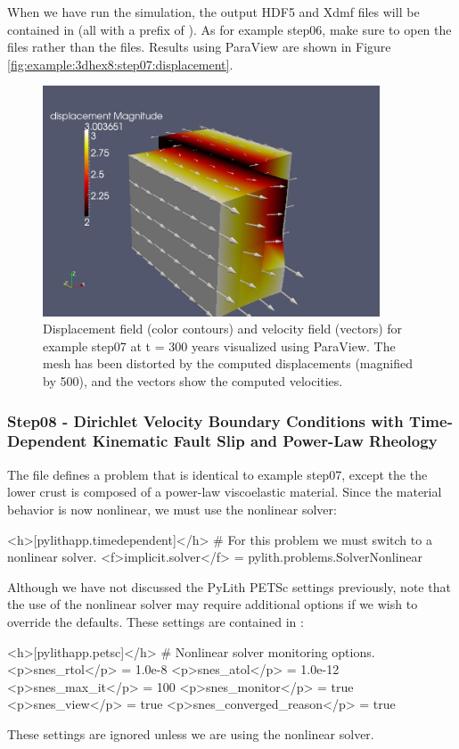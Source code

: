 When we have run the simulation, the output HDF5 and Xdmf files will
be contained in  (all with a prefix
of ). As for example step06, make sure to open the
 files rather than the  files. Results using
ParaView are shown in Figure \vref{fig:example:3dhex8:step07:displacement}.

\begin{figure}
  \includegraphics[width=10cm]{examples/figs/3dhex8_step07-displ-vel-t300}
  \caption{Displacement field (color contours) and velocity field (vectors) for
    example step07 at t = 300 years visualized using ParaView. The mesh
    has been distorted by the computed displacements (magnified by 500),
    and the vectors show the computed velocities.}
  \label{fig:example:3dhex8:step07:displacement}
\end{figure}


\subsubsection{Step08 - Dirichlet Velocity Boundary Conditions with Time-Dependent Kinematic Fault Slip and Power-Law Rheology}
\label{sec:example:3dhex8:step08}

The  file defines a problem that is identical to
example step07, except the the lower crust is composed of a power-law
viscoelastic material. Since the material behavior is now nonlinear,
we must use the nonlinear solver:
\begin{cfg}
<h>[pylithapp.timedependent]</h>
# For this problem we must switch to a nonlinear solver.
<f>implicit.solver</f> = pylith.problems.SolverNonlinear
\end{cfg}
Although we have not discussed the PyLith PETSc settings previously,
note that the use of the nonlinear solver may require additional options
if we wish to override the defaults. These settings are contained
in :
\begin{cfg}
<h>[pylithapp.petsc]</h>
# Nonlinear solver monitoring options.
<p>snes_rtol</p> = 1.0e-8
<p>snes_atol</p> = 1.0e-12
<p>snes_max_it</p> = 100
<p>snes_monitor</p> = true
<p>snes_view</p> = true
<p>snes_converged_reason</p> = true
\end{cfg}
These settings are ignored unless we are using the nonlinear solver.

